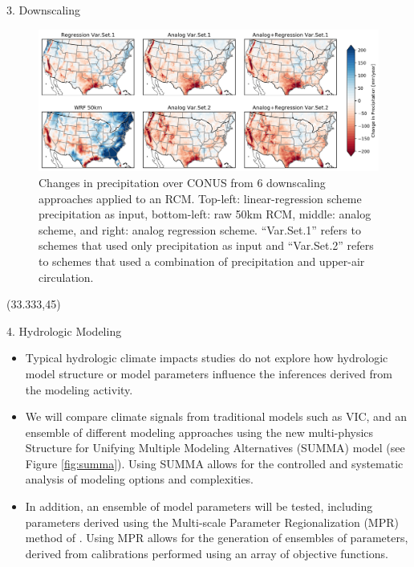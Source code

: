 \documentclass{beamer}
\begin{document}
\begin{frame}{}
\begin{columns}
\begin{column}{.3333\paperwidth}
\begin{textblock}{\textwidth \TPHorizModule}
\begin{block}{3. Downscaling}
\begin{itemize}
     \end{itemize}

     \vspace{-0.5cm}
     \begin{figure}
      \center\includegraphics[width=0.8\linewidth]{figures/precip_change.png}
      \caption{Changes in precipitation over CONUS from 6 downscaling approaches applied to an RCM. Top-left: linear-regression scheme precipitation as input, bottom-left: raw 50km RCM, middle: analog scheme, and right: analog regression scheme. ``Var.Set.1'' refers to schemes that used only precipitation as input and ``Var.Set.2'' refers to schemes that used a combination of precipitation and upper-air circulation.}
      \label{fig:downscaling}
     \end{figure}

    \end{block}

   \end{textblock}



   \begin{textblock}{\textwidth \TPHorizModule}(33.333,45)
    \begin{block}{4. Hydrologic Modeling}

        \begin{itemize}
         \justifying
         \item Typical hydrologic climate impacts studies do not explore how hydrologic model structure or model parameters influence the inferences derived from the modeling activity.
         \item We will compare climate signals from traditional models such as VIC, and an ensemble of different modeling approaches using the new multi-physics Structure for Unifying Multiple Modeling Alternatives (SUMMA) model \citep{Clark_2015} (see Figure \ref{fig:summa}). Using SUMMA allows for the controlled and systematic analysis of modeling options and complexities.
         \item In addition, an ensemble of model parameters will be tested, including parameters derived using the Multi-scale Parameter Regionalization (MPR) method of \citet{Samaniego_2010}. Using MPR allows for the generation of ensembles of parameters, derived from calibrations performed using an array of objective functions.
        \end{itemize}


\end{block}
\end{textblock}
\end{column}
\end{columns}
\end{frame}
\end{document}
